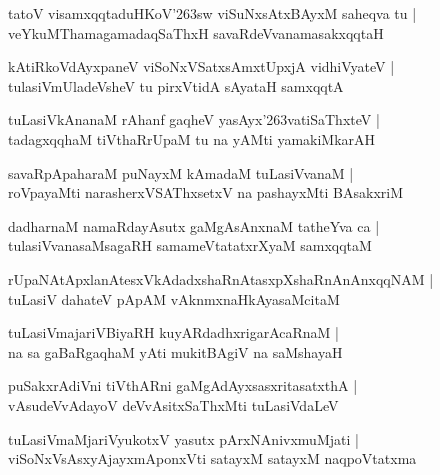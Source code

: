 \documentclass[twoside,12pt,openright]{book}
\def\S{\char'263}
\newcounter{shloka}[chapter]
\begin{document}
\begin{shloka}%
tatoV visamxqqtaduHKoV\S sw viSuNxsAtxBAyxM saheqva tu |\\
veYkuMThamagamadaqSaThxH savaRdeVvanamasakxqqtaH  
\end{shloka}

\begin{shloka}%
kAtiRkoVdAyxpaneV viSoNxVSatxsAmxtUpxjA vidhiVyateV |\\
tulasiVmUladeVsheV tu pirxVtidA sAyataH samxqqtA 
\end{shloka}

\begin{shloka}%
tuLasiVkAnanaM rAhanf gaqheV yasAyx\S vatiSaThxteV |\\
tadagxqqhaM tiVthaRrUpaM tu na yAMti yamakiMkarAH 
\end{shloka}

\begin{shloka}%
savaRpApaharaM puNayxM kAmadaM tuLasiVvanaM |\\
roVpayaMti narasherxVSAThxsetxV na pashayxMti BAsakxriM 
\end{shloka}

\begin{shloka}%
dadharnaM namaRdayAsutx gaMgAsAnxnaM tatheYva ca |\\
tulasiVvanasaMsagaRH samameVtatatxrXyaM samxqqtaM 
\end{shloka}

\begin{shloka}%
rUpaNAtApxlanAtesxVkAdadxshaRnAtasxpXshaRnAnAnxqqNAM |\\
tuLasiV dahateV pApAM vAknmxnaHkAyasaMcitaM 
\end{shloka}

\begin{shloka}%
tuLasiVmajariVBiyaRH kuyARdadhxrigarAcaRnaM |\\
na sa gaBaRgaqhaM yAti mukitBAgiV na saMshayaH 
\end{shloka}

\begin{shloka}%
puSakxrAdiVni tiVthARni gaMgAdAyxsasxritasatxthA |\\
vAsudeVvAdayoV deVvAsitxSaThxMti tuLasiVdaLeV 
\end{shloka}

\begin{shloka}%
tuLasiVmaMjariVyukotxV yasutx pArxNAnivxmuMjati |\\
viSoNxVsAsxyAjayxmAponxVti satayxM satayxM naqpoVtatxma
\end{shloka}
\end{document}
